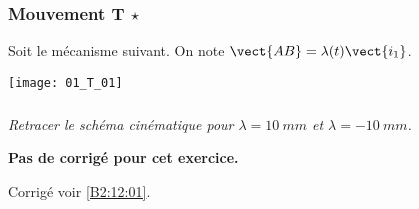 \normaltrue
\correctionfalse


\subsubsection{Mouvement T $\star$ \label{B2:12:01}}
\setcounter{exo}{0}

\ifprof
\else
Soit le mécanisme suivant. On note $\vect{AB}=\lambda(t)\vect{i_1}$.
\begin{center}
\texttt{[image: 01\_T\_01]}
\end{center}
\fi
\subparagraph{}
\textit{Retracer le schéma cinématique pour $\lambda=\SI{10}{mm}$ et $\lambda=-\SI{10}{mm}$.}
\ifprof

\ifcorrection
\else
\textbf{Pas de corrigé pour cet exercice.}
\fi
\else
\fi

\ifprof
\else
\begin{flushright}
\footnotesize{Corrigé  voir \ref{B2:12:01}.}
\end{flushright}%
\fi